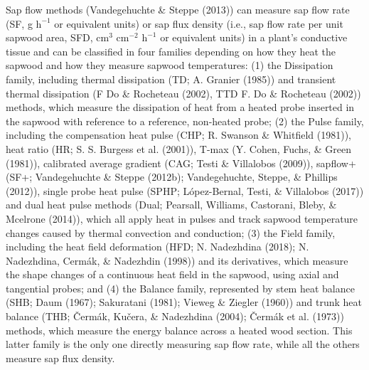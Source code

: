 \documentclass[11pt,twoside]{reedthesis}
\begin{document}
Sap flow methods (Vandegehuchte \& Steppe (2013)) can measure sap flow
rate (SF, g \(\text{h}^{-1}\) or equivalent units) or sap flux density
(i.e., sap flow rate per unit sapwood area, SFD, \(\text{cm}^3\)
\(\text{cm}^{-2}\) \(\text{h}^{-1}\) or equivalent units) in a plant's
conductive tissue and can be classified in four families depending on
how they heat the sapwood and how they measure sapwood temperatures: (1)
the Dissipation family, including thermal dissipation (TD; A. Granier
(1985)) and transient thermal dissipation (F Do \& Rocheteau (2002), TTD
F. Do \& Rocheteau (2002)) methods, which measure the dissipation of
heat from a heated probe inserted in the sapwood with reference to a
reference, non-heated probe; (2) the Pulse family, including the
compensation heat pulse (CHP; R. Swanson \& Whitfield (1981)), heat
ratio (HR; S. S. Burgess et al. (2001)), T-max (Y. Cohen, Fuchs, \&
Green (1981)), calibrated average gradient (CAG; Testi \& Villalobos
(2009)), sapflow+ (SF+; Vandegehuchte \& Steppe (2012b); Vandegehuchte,
Steppe, \& Phillips (2012)), single probe heat pulse (SPHP;
López-Bernal, Testi, \& Villalobos (2017)) and dual heat pulse methods
(Dual; Pearsall, Williams, Castorani, Bleby, \& Mcelrone (2014)), which
all apply heat in pulses and track sapwood temperature changes caused by
thermal convection and conduction; (3) the Field family, including the
heat field deformation (HFD; N. Nadezhdina (2018); N. Nadezhdina,
Cermák, \& Nadezhdin (1998)) and its derivatives, which measure the
shape changes of a continuous heat field in the sapwood, using axial and
tangential probes; and (4) the Balance family, represented by stem heat
balance (SHB; Daum (1967); Sakuratani (1981); Vieweg \& Ziegler (1960))
and trunk heat balance (THB; Čermák, Kučera, \& Nadezhdina (2004);
Čermák et al. (1973)) methods, which measure the energy balance across a
heated wood section. This latter family is the only one directly
measuring sap flow rate, while all the others measure sap flux
density.\par
\end{document}
